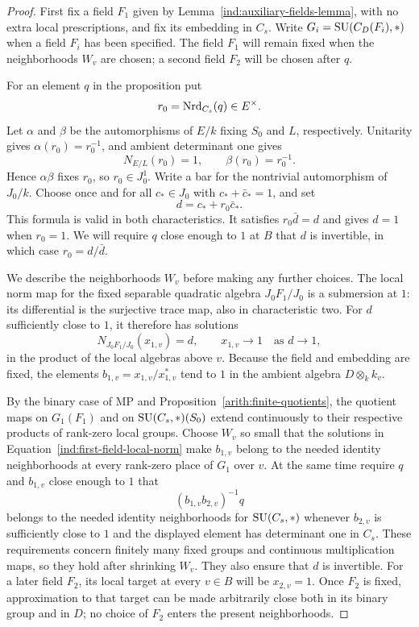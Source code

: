 \begin{proof}
First fix a field $F_1$ given by
Lemma~\ref{ind:auxiliary-fields-lemma}, with no extra local
prescriptions, and fix its embedding in $C_s$.  Write
$G_i=\operatorname{SU}(C_D(F_i),*)$ when a field $F_i$ has been specified.
The field $F_1$ will remain fixed when the neighborhoods $W_v$
are chosen; a second field $F_2$ will be chosen after $q$.

For an element $q$ in the proposition put
\[
 r_0=\operatorname{Nrd}_{C_s}(q)\in E^\times.
\]
Let $\alpha$ and $\beta$ be the automorphisms of $E/k$ fixing
$S_0$ and $L$, respectively.  Unitarity gives
$\alpha(r_0)=r_0^{-1}$, and ambient determinant one gives
\[
 N_{E/L}(r_0)=1,\qquad\beta(r_0)=r_0^{-1}.
\]
Hence $\alpha\beta$ fixes $r_0$, so $r_0\in J_0^1$.
Write a bar for the nontrivial automorphism of $J_0/k$.
Choose once and for all $c_*\in J_0$ with
$c_*+\bar c_*=1$, and set
\begin{equation}\label{ind:determinant-hilbert90}
 d=c_*+r_0\bar c_*.
\end{equation}
This formula is valid in both characteristics.  It satisfies
$r_0\bar d=d$ and gives $d=1$ when $r_0=1$.
We will require $q$ close enough to $1$ at $B$ that $d$ is
invertible, in which case $r_0=d/\bar d$.

We describe the neighborhoods $W_v$ before making any further
choices.  The local norm map for the fixed separable quadratic
algebra $J_0F_1/J_0$ is a submersion at $1$: its differential is
the surjective trace map, also in characteristic two.
For $d$ sufficiently close to $1$, it therefore has solutions
\begin{equation}\label{ind:first-field-local-norm}
 N_{J_0F_1/J_0}(x_{1,v})=d,\qquad x_{1,v}\longrightarrow1
 \quad\text{as }d\longrightarrow1,
\end{equation}
in the product of the local algebras above $v$.
Because the field and embedding are fixed, the elements
$b_{1,v}=x_{1,v}/x_{1,v}^*$ tend to $1$ in the ambient algebra
$D\otimes_k k_v$.

By the binary case of MP and
Proposition~\ref{arith:finite-quotients}, the quotient maps on
$G_1(F_1)$ and on $\operatorname{SU}(C_s,*)(S_0)$ extend continuously to
their respective products of rank-zero local groups.
Choose $W_v$ so small that the solutions in
Equation~\eqref{ind:first-field-local-norm} make $b_{1,v}$
belong to the needed identity neighborhoods at every rank-zero
place of $G_1$ over $v$.  At the same time require $q$ and
$b_{1,v}$ close enough to $1$ that
\[
 (b_{1,v}b_{2,v})^{-1}q
\]
belongs to the needed identity neighborhoods for
$\operatorname{SU}(C_s,*)$ whenever $b_{2,v}$ is sufficiently close to $1$
and the displayed element has determinant one in $C_s$.
These requirements concern finitely many fixed groups and
continuous multiplication maps, so they hold after shrinking
$W_v$.  They also ensure that $d$ is invertible.
For a later field $F_2$, its local target at every $v\in B$
will be $x_{2,v}=1$.  Once $F_2$ is fixed, approximation to that
target can be made arbitrarily close both in its binary group
and in $D$; no choice of $F_2$ enters the present neighborhoods.


\end{proof}
